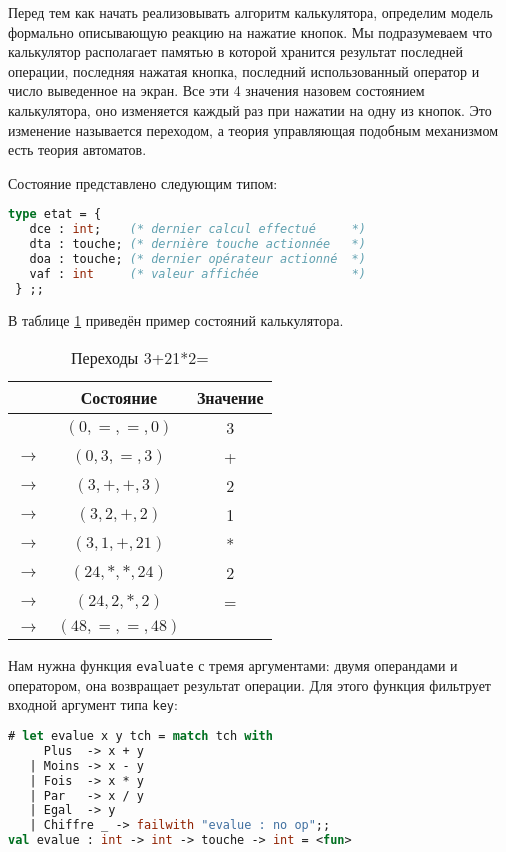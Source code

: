 Перед тем как начать реализовывать алгоритм калькулятора, определим модель
формально описывающую реакцию на нажатие кнопок. Мы подразумеваем что
калькулятор располагает памятью в которой хранится результат последней операции,
последняя нажатая кнопка, последний использованный оператор и число выведенное
на экран. Все эти 4 значения назовем состоянием калькулятора, оно изменяется
каждый раз при нажатии на одну из кнопок. Это изменение называется переходом, а
теория управляющая подобным механизмом есть теория автоматов.

Состояние представлено следующим типом:

\begin{lstlisting}[language=OCaml]
type etat = {
   dce : int;    (* dernier calcul effectué     *)
   dta : touche; (* dernière touche actionnée   *)
   doa : touche; (* dernier opérateur actionné  *)
   vaf : int     (* valeur affichée             *)
 } ;;
\end{lstlisting}

В таблице \ref{tbl:transitions_for_3+21*2=} приведён пример состояний
калькулятора.

\begin{table}[hl]
\begin{center}
	\caption{Переходы 3+21*2=}
	\begin{tabular}{|c|c|c|}
	\hline
	 & Состояние & Значение \\
	\hline
	 & $(0, =, =, 0)$ & 3 \\
	\hline
	$\to$ & $(0, 3, =, 3)$ & + \\
	\hline
	$\to$ & $(3, +, +, 3)$ & 2 \\
	\hline
	$\to$ & $(3, 2, +, 2)$ & 1 \\
	\hline
	$\to$ & $(3, 1, +, 21)$ & * \\
	\hline
	$\to$ & $(24, *, *, 24)$ & 2 \\
	\hline
	$\to$ & $(24, 2, *, 2)$ & = \\
	\hline
	$\to$ & $(48, =, =, 48)$ & \\
	\hline
	\end{tabular}
\end{center}
	\label{tbl:transitions_for_3+21*2=}
\end{table}

Нам нужна функция \texttt{evaluate} с тремя аргументами: двумя операндами и
оператором, она возвращает результат операции. Для этого функция фильтрует
входной аргумент типа \texttt{key}:

\begin{lstlisting}[language=OCaml]
# let evalue x y tch = match tch with
     Plus  -> x + y
   | Moins -> x - y
   | Fois  -> x * y
   | Par   -> x / y
   | Egal  -> y
   | Chiffre _ -> failwith "evalue : no op";;
val evalue : int -> int -> touche -> int = <fun>
\end{lstlisting}

